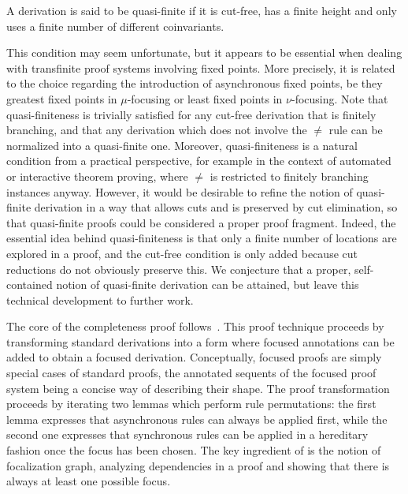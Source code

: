 \begin{definition}
A derivation is said to be quasi-finite if
it is cut-free,
has a finite height
and only uses a finite number of different coinvariants.
\end{definition}

This condition may seem unfortunate, but it appears to be essential
when dealing with transfinite proof systems involving fixed points. More
precisely, it is related to the choice regarding the introduction of
asynchronous fixed points, be they greatest fixed points in $\mu$-focusing
or least fixed points in $\nu$-focusing.
Note that quasi-finiteness is trivially satisfied
for any cut-free derivation that is finitely branching,
and that any derivation which does not involve the $\neq$ rule
can be normalized into a quasi-finite one.
Moreover,
quasi-finiteness is a natural condition from a practical perspective,
for example in the context of automated or interactive theorem proving,
where $\neq$ is restricted to finitely branching instances anyway.
However, it would be desirable to refine the notion of quasi-finite
derivation in a way that allows cuts and is preserved by cut elimination,
so that quasi-finite proofs could be considered a proper proof fragment.
Indeed, the essential idea behind quasi-finiteness is that
only a finite number of locations are explored in a proof,
and the cut-free condition is only added because cut reductions
do not obviously preserve this.
We conjecture that a proper, self-contained notion of quasi-finite
derivation can be attained,
but leave this technical development to further work.



The core of the completeness proof follows~\cite{miller07cslb}.
This proof technique proceeds by transforming standard derivations
into a form where focused annotations can be added to obtain a focused
derivation. Conceptually, focused proofs are simply special cases
of standard proofs, the annotated sequents of the focused proof system
being a concise way of describing their shape.
The proof transformation proceeds by iterating two lemmas which
perform rule permutations: the first lemma expresses that 
asynchronous rules can always be applied first, while the second one
expresses that synchronous rules can be applied in a hereditary fashion
once the focus has been chosen.
The key ingredient of \cite{miller07cslb} is the notion of focalization
graph, analyzing dependencies in a proof and showing that there is always
at least one possible focus.


